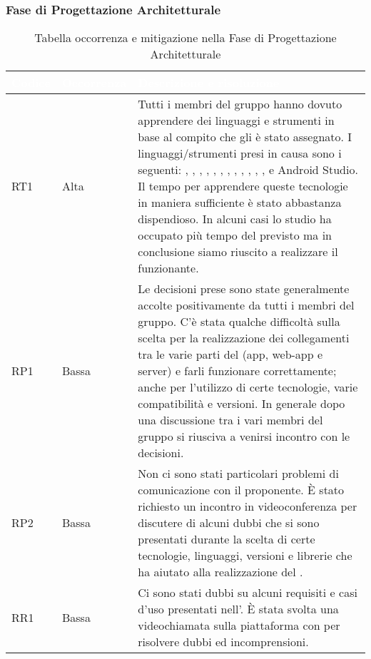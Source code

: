 \subsubsection{Fase di Progettazione Architetturale}
{
\renewcommand{\arraystretch}{2}
\centering
\begin{longtable}{C{2cm} C{3cm} C{10cm}}
\caption{Tabella occorrenza e mitigazione nella Fase di Progettazione Architetturale}\\

\textcolor{white}{\textbf{Codice}} & 
\textcolor{white}{\textbf{Occorrenza}} & 
\textcolor{white}{\textbf{Descrizione e risoluzione}}\\	
\endhead

RT1 &
Alta &
Tutti i membri del gruppo hanno dovuto apprendere dei linguaggi e strumenti in base al compito che gli è stato assegnato. I linguaggi/strumenti presi in causa sono i seguenti: , , , , , , , , , , , ,  e Android Studio. Il tempo per apprendere queste tecnologie in maniera sufficiente è stato abbastanza dispendioso. In alcuni casi lo studio ha occupato più tempo del previsto ma in conclusione siamo riuscito a realizzare il  funzionante. \\

RP1 &
Bassa &
Le decisioni prese sono state generalmente accolte positivamente da tutti i membri del gruppo. C'è stata qualche difficoltà sulla scelta per la realizzazione dei collegamenti tra le varie parti del  (app, web-app e server) e farli funzionare correttamente; anche per l'utilizzo di certe tecnologie, varie compatibilità e versioni. In generale dopo una discussione tra i vari membri del gruppo si riusciva a venirsi incontro con le decisioni. \\

RP2 &
Bassa &
Non ci sono stati particolari problemi di comunicazione con il proponente. È stato richiesto un incontro in videoconferenza per discutere di alcuni dubbi che si sono presentati durante la scelta di certe tecnologie, linguaggi, versioni e librerie che ha aiutato alla realizzazione del . \\

RR1 &
Bassa &
Ci sono stati dubbi su alcuni requisiti e casi d'uso presentati nell'. È stata svolta una videochiamata sulla piattaforma  con \CR{} per risolvere dubbi ed incomprensioni. \\


\end{longtable}}
